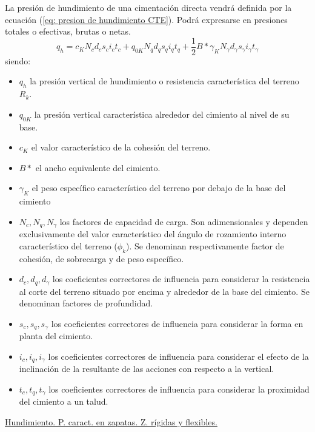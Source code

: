 La presión de hundimiento de una cimentación directa vendrá definida por la ecuación (\ref{eq: presion de hundimiento CTE}). Podrá expresarse en presiones totales o efectivas, brutas o netas.
\begin{equation}
    q_h = c_K N_c d_c s_c i_c t_c + q_{0K}N_q d_q s_q i_q t_q + \frac{1}{2}B* \gamma_K N_\gamma d_\gamma s_\gamma i_\gamma t_\gamma
    \label{eq: presion de hundimiento CTE}
\end{equation}
siendo:
\begin{itemize}
    \item $q_h$ la presión vertical de hundimiento o resistencia característica del terreno $R_k$.
    \item $q_{0K}$ la presión vertical característica alrededor del cimiento al nivel de su base.
    \item $c_K$ el valor característico de la cohesión del terreno.
    \item $B*$ el ancho equivalente del cimiento.
    \item $\gamma_K$ el peso específico característico del terreno por debajo de la base del cimiento
    \item $N_c, N_q, N_\gamma$ los factores de capacidad de carga. Son adimensionales y dependen exclusivamente del valor característico del ángulo de rozamiento interno característico del terreno ($\phi_k$). Se denominan respectivamente factor de cohesión, de sobrecarga y de peso específico.
    \item $d_c, d_q, d_\gamma$ los coeficientes correctores de influencia para considerar la resistencia al corte del terreno situado por encima y alrededor de la base del cimiento. Se denominan factores de profundidad.
    \item $s_c, s_q, s_\gamma$ los coeficientes correctores de influencia para considerar la forma en planta del cimiento.
    \item $i_c, i_q, i_\gamma$ los coeficientes correctores de influencia para considerar el efecto de la inclinación de la resultante de las acciones con respecto a la vertical.
    \item $t_c, t_q, t_\gamma$ los coeficientes correctores de influencia para considerar la proximidad del cimiento a un talud.
\end{itemize}

\noindent \underline{Hundimiento. P. caract. en zapatas. Z. rígidas y flexibles.}



